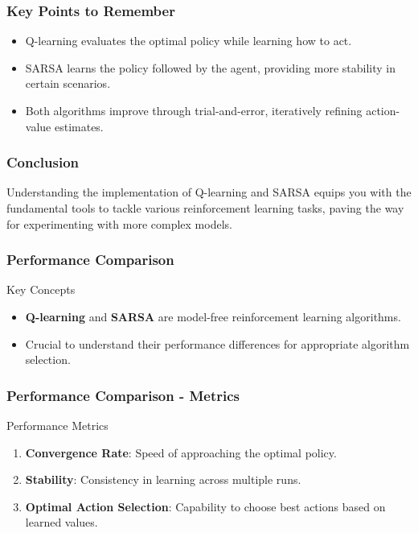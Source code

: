 \documentclass{beamer}
\begin{document}
\begin{frame}
    \frametitle{Key Points to Remember}
    \begin{itemize}
        \item Q-learning evaluates the optimal policy while learning how to act.
        \item SARSA learns the policy followed by the agent, providing more stability in certain scenarios.
        \item Both algorithms improve through trial-and-error, iteratively refining action-value estimates.
    \end{itemize}
\end{frame}

\begin{frame}
    \frametitle{Conclusion}
    \begin{block}{}
    Understanding the implementation of Q-learning and SARSA equips you with the fundamental tools to tackle various reinforcement learning tasks, paving the way for experimenting with more complex models.
    \end{block}
\end{frame}

\begin{frame}[fragile]
    \frametitle{Performance Comparison}
    \begin{block}{Key Concepts}
        \begin{itemize}
            \item \textbf{Q-learning} and \textbf{SARSA} are model-free reinforcement learning algorithms.
            \item Crucial to understand their performance differences for appropriate algorithm selection.
        \end{itemize}
    \end{block}
\end{frame}

\begin{frame}[fragile]
    \frametitle{Performance Comparison - Metrics}
    \begin{block}{Performance Metrics}
        \begin{enumerate}
            \item \textbf{Convergence Rate}: Speed of approaching the optimal policy.
            \item \textbf{Stability}: Consistency in learning across multiple runs.
            \item \textbf{Optimal Action Selection}: Capability to choose best actions based on learned values.
        \end{enumerate}
    \end{block}
\end{frame}
\end{document}
